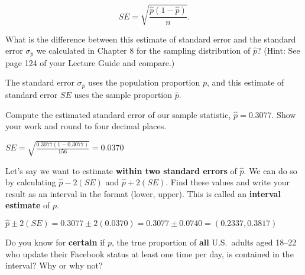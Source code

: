 \documentclass[noanswers]{exam}
\begin{document}
\begin{questions}
$$SE=\sqrt{\frac{\hat{p}(1-\hat{p})}{n}}.$$

\vspace{1mm}

	What is the difference between this estimate of standard error and the standard error $\sigma_{\hat{p}}$ we calculated in Chapter 8 for the sampling distribution of $\hat{p}$? (Hint: See page 124 of your Lecture Guide and compare.)
	
	\begin{solution}[\stretch{1}]
	
	\vspace{1mm}

	The standard error $\sigma_{\hat{p}}$ uses the population proportion $p$, and this estimate of standard error $SE$ uses the sample proportion $\hat{p}$.
	
	\vspace{1mm}

	\end{solution}	

\question Compute the estimated standard error of our sample statistic, $\hat{p}=0.3077$. Show your work and round to four decimal places.

	\begin{solution}[\stretch{1}]
	
	\vspace{1mm}

	$SE=\sqrt{\frac{0.3077(1-0.3077)}{156}}=0.0370$
	
	\vspace{1mm}

	\end{solution}
	
	\question Let's say we want to estimate \textbf{within two standard errors} of $\hat{p}$. We can do so by calculating $\hat{p}-2(SE)$ and $\hat{p}+2(SE)$. Find these values and write your result as an interval in the format (lower, upper). This is called an \textbf{interval estimate} of $p$.
	
	\begin{solution}[\stretch{1}]
	
	\vspace{1mm}

	$\hat{p}\pm 2(SE)=0.3077\pm 2(0.0370)=0.3077\pm0.0740=(0.2337,0.3817)$
	
	\vspace{1mm}

	\end{solution}
	
	\question Do you know for \textbf{certain} if $p$, the true proportion of \textbf{all} U.S.\ adults aged 18--22 who update their Facebook status at least one time per day, is contained in the interval? Why or why not?
	

\end{questions}
\end{document}
